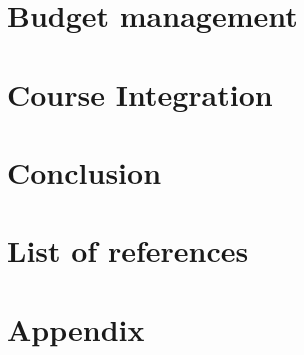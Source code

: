 \documentclass[11pt]{article}
\begin{document}
\section{Budget management}

\section{Course Integration}

\section{Conclusion}

\section{List of references}

\section{Appendix}
\end{document}
